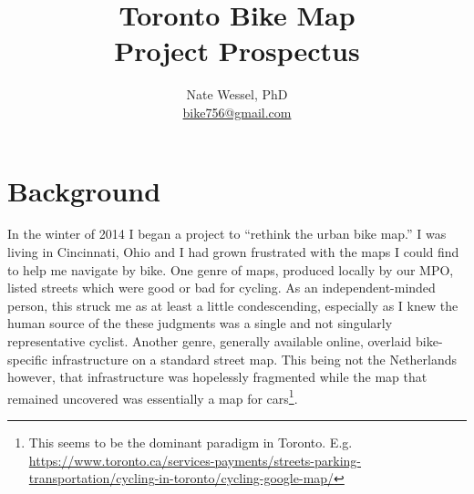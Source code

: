 \documentclass{article}
\title{Toronto Bike Map \\ Project Prospectus}
\author{Nate Wessel, PhD \\ \href{mailto:bike756@gmail.com}{bike756@gmail.com}}
\begin{document}
	\maketitle
	
	\section*{Background}
		In the winter of 2014 I began a project to ``rethink the urban bike map.''\cite{Wessel2015} 
		I was living in Cincinnati, Ohio and I had grown frustrated with the maps I could find to help me navigate by bike. One genre of maps, produced locally by our MPO, listed streets which were {\color{ForestGreen}good} or {\color{red}bad} for cycling. As an independent-minded person, this struck me as at least a little condescending, especially as I knew the human source of the these judgments was a single and not singularly representative cyclist.
		Another genre, generally available online, overlaid bike-specific infrastructure on a standard street map. This being not the Netherlands however, that infrastructure was hopelessly fragmented while the map that remained uncovered was essentially a map for cars\footnote{This seems to be the dominant paradigm in Toronto. E.g. \href{https://www.toronto.ca/services-payments/streets-parking-transportation/cycling-in-toronto/cycling-google-map/}{https://www.toronto.ca/services-payments/streets-parking-transportation/cycling-in-toronto/cycling-google-map/}}.
	
\end{document}
